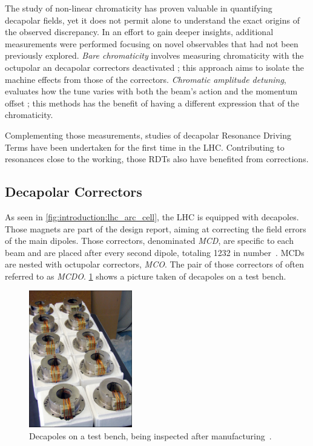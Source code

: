 The study of non-linear chromaticity has proven valuable in quantifying decapolar fields, yet it
does not permit alone to understand the exact origins of the observed discrepancy. In an effort to
gain deeper insights, additional measurements were performed focusing on novel observables that had
not been previously explored.
\textit{Bare chromaticity} involves measuring chromaticity with
the octupolar an decapolar correctors deactivated ; this approach aims to isolate the machine
effects from those of the correctors.
\textit{Chromatic amplitude detuning}, evaluates how the tune varies with both the beam's action and
the momentum offset ; this methods has the benefit of having a different expression that of the
chromaticity.

Complementing those measurements, studies of decapolar Resonance Driving Terms have been undertaken
for the first time in the LHC. Contributing to resonances close to the working, those RDTs also have
benefited from corrections.


\subsection{Decapolar Correctors}

As seen in \cref{fig:introduction:lhc_arc_cell}, the LHC is equipped with decapoles. Those magnets
are part of the design report, aiming at correcting the field errors of the main dipoles.
Those correctors, denominated \textit{MCD}, are specific to each beam and are placed after every
second dipole, totaling 1232 in number~\cite{venturini_delsolaro_magnetic_2005}.
MCDs are nested with octupolar correctors, \textit{MCO}. The pair of those correctors of often
referred to as \textit{MCDO}. 
\cref{fig:decapoles:decapole_picture} shows a picture taken of decapoles on a test bench.

\begin{figure}
    \centering
    \includegraphics[width=0.4\textwidth]{./images/decapoles_real_pic.jpg}
    \caption{Decapoles on a test bench, being inspected after
    manufacturing~\cite{noauthor_ten_2001}.}
    \label{fig:decapoles:decapole_picture}
\end{figure}


